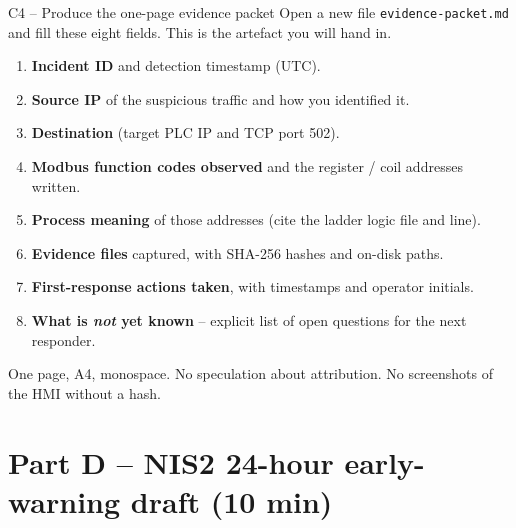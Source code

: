 \documentclass[11pt,a4paper]{article}
\begin{document}
\begin{stepbox}{C4 -- Produce the one-page evidence packet}
Open a new file \texttt{evidence-packet.md} and fill these eight fields. This is the artefact you will hand in.
\begin{enumerate}\setlength{\itemsep}{1pt}
  \item \textbf{Incident ID} and detection timestamp (UTC).
  \item \textbf{Source IP} of the suspicious traffic and how you identified it.
  \item \textbf{Destination} (target PLC IP and TCP port 502).
  \item \textbf{Modbus function codes observed} and the register / coil addresses written.
  \item \textbf{Process meaning} of those addresses (cite the ladder logic file and line).
  \item \textbf{Evidence files} captured, with SHA-256 hashes and on-disk paths.
  \item \textbf{First-response actions taken}, with timestamps and operator initials.
  \item \textbf{What is \emph{not} yet known} -- explicit list of open questions for the next responder.
\end{enumerate}
One page, A4, monospace. No speculation about attribution. No screenshots of the HMI without a hash.
\end{stepbox}

\section*{Part D -- NIS2 24-hour early-warning draft (10 min)}
\end{document}
